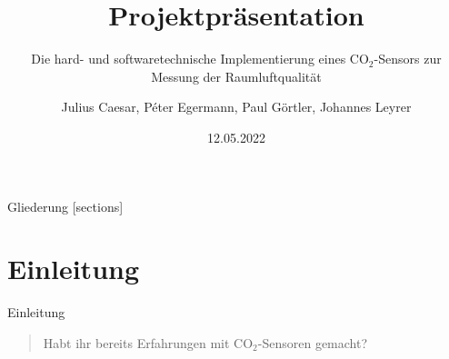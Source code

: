 \documentclass[10pt,ngerman]{beamer}
\title{Projektpräsentation}
\date{12.05.2022}
\author{Julius Caesar, Péter Egermann, Paul Görtler, Johannes Leyrer}
\institute{BSZ für Elektrotechnik Dresden -- IT20/2}
\subtitle{Die hard- und softwaretechnische Implementierung eines CO$_2$-Sensors zur Messung der Raumluftqualität}
\begin{document}
\maketitle

\begin{frame}{Gliederung}
    [sections]
    \tableofcontents[hideallsubsections]
\end{frame}

\section{Einleitung}
\begin{frame}[fragile]{Einleitung}
    \begin{minipage}[t]{1\textwidth}
        \begin{quotation}
            Habt ihr bereits Erfahrungen mit CO$_2$-Sensoren gemacht?
        \end{quotation}
    \end{minipage}
\end{frame}

\end{document}

